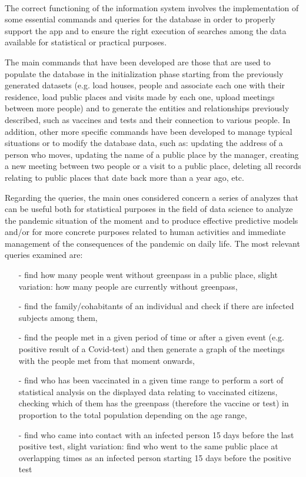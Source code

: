 \documentclass[a4paper,12pt]{article}
\begin{document}
\paragraph{} The correct functioning of the information system involves the implementation of some essential commands and queries for the database in order to properly support the app and to ensure the right execution of searches among the data available for statistical or practical purposes. \par
The main commands that have been developed are those that are used to populate the database in the initialization phase starting from the previously generated datasets (e.g. load houses, people and associate each one with their residence, load public places and visits made by each one, upload meetings between more people) and to generate the entities and relationships previously described, such as vaccines and tests and their connection to various people. In addition, other more specific commands have been developed to manage typical situations or to modify the database data, such as: updating the address of a person who moves, updating the name of a public place by the manager, creating a new meeting between two people or a visit to a public place, deleting all records relating to public places that date back more than a year ago, etc. \par
Regarding the queries, the main ones considered concern a series of analyzes that can be useful both for statistical purposes in the field of data science to analyze the pandemic situation of the moment and to produce effective predictive models and/or for more concrete purposes related to human activities and immediate management of the consequences of the pandemic on daily life. The most relevant queries examined are:
  \begin{itemize}[noitemsep]
   \item[-] find how many people went without greenpass in a public place, slight variation: how many people are currently without greenpass,
    \item[-] find the family/cohabitants of an individual and check if there are infected subjects among them,
    \item[-] find the people met in a given period of time or after a given event (e.g. positive result of a Covid-test) and then generate a graph of the meetings with the people met from that moment onwards,
    \item[-] find who has been vaccinated in a given time range to perform a sort of statistical analysis on the displayed data relating to vaccinated citizens, checking which of them has the greenpass (therefore the vaccine or test) in proportion to the total population depending on the age range,
    \item[-] find who came into contact with an infected person 15 days before the last positive test, slight variation: find who went to the same public place at overlapping times as an infected person starting 15 days before the positive test
  \end{itemize}
\end{document}
